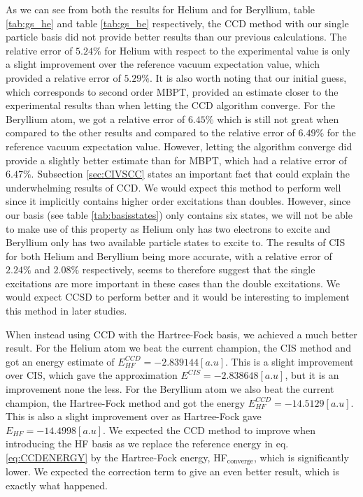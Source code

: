 \documentclass[a4paper,12pt]{article}
\begin{document}
As we can see from both the results for Helium and for Beryllium, table \ref{tab:gs_he} and table \ref{tab:gs_be} respectively, the CCD method with our single particle basis did not provide better results than our previous calculations. The relative error of $5.24\%$ for Helium with respect to the experimental value is only a slight improvement over the reference vacuum expectation value, which provided a relative error of $5.29\%$.  It is also worth noting that our initial guess, which corresponds to second order MBPT, provided an estimate closer to the experimental results than when letting the CCD algorithm converge. For the Beryllium atom, we got a relative error of $6.45\%$ which is still not great when compared to the other results and compared to the relative error of $6.49\%$ for the reference vacuum expectation value. However, letting the algorithm converge did provide a slightly better estimate than for MBPT, which had a relative error of $6.47\%$. Subsection \ref{sec:CIVSCC} states an important fact that could explain the underwhelming results of CCD. We would expect this method to perform well since it implicitly contains higher order excitations than doubles. However, since our basis (see table \ref{tab:basisstates}) only contains six states, we will not be able to make use of this property as Helium only has two electrons to excite and Beryllium only has two available particle states to excite to. The results of CIS for both Helium and Beryllium being more accurate, with a relative error of $2.24\%$ and $2.08\%$ respectively, seems to therefore suggest that the single excitations are more important in these cases than the double excitations. We would expect CCSD to perform better and it would be interesting to implement this method in later studies.

\bigskip

When instead using CCD with the Hartree-Fock basis, we achieved a much better result. For the Helium atom we beat the current champion, the CIS method and got an energy estimate of $E^{CCD}_{HF} = -2.839144 [a.u]$. This is a slight improvement over CIS, which gave the approximation $E^{CIS} = -2.838648 [a.u]$, but it is an improvement none the less. For the Beryllium atom we also beat the current champion, the Hartree-Fock method and got the energy $E^{CCD}_{HF} = -14.5129 [a.u]$. This is also a slight improvement over as Hartree-Fock gave $E_{HF} = -14.4998 [a.u]$. We expected the CCD method to improve when introducing the HF basis as we replace the reference energy in eq. \ref{eq:CCDENERGY} by the Hartree-Fock energy, HF$_{\text{converge}}$, which is significantly lower. We expected the correction term to give an even better result, which is exactly what happened.
\end{document}
